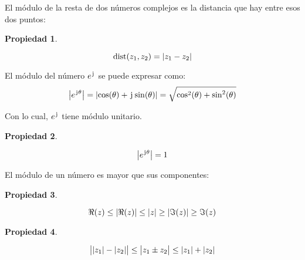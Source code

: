 \documentclass[a5paper,12pt,twoside]{book}
\newtheorem{prop}{{Propiedad}}[chapter]
\begin{document}
El módulo de la resta de dos números complejos es la distancia que hay entre esos dos puntos:

\begin{mdframed}[style=PropertyFrame]
    \begin{prop}
        \label{prop:distance}
    \end{prop}
    \begin{equation*}
        \operatorname{dist}(z_1,z_2)={\left| {z_1-z_2} \right|}
    \end{equation*}
\end{mdframed}

El módulo del número $e^{\mkern2mu\mathrm{j}\mkern1mu}$ se puede expresar como:
\begin{equation*}
    {\left| {e^{\mkern2mu\mathrm{j}\mkern1mu\theta}} \right|} = {\left| {\cos(\theta) + \mkern2mu\mathrm{j}\mkern1mu \sin(\theta)} \right|} = \sqrt{\cos^2(\theta) + \sin^2(\theta)}
\end{equation*}

Con lo cual, $e^{\mkern2mu\mathrm{j}\mkern1mu}$ tiene módulo unitario.

\begin{mdframed}[style=PropertyFrame]
    \begin{prop}
        \label{prop:eAbsoluteValue}
    \end{prop}
    \begin{equation*}
        {\left| {e^{\mkern2mu\mathrm{j}\mkern1mu\theta}} \right|} = 1
    \end{equation*}
\end{mdframed}

El módulo de un número es mayor que sus componentes:

\begin{mdframed}[style=PropertyFrame]
    \begin{prop}
        \label{prop:zAbsoluteValue}
    \end{prop}
    \begin{equation*}
        \Re(z) \leq {\left| {\Re(z)} \right|} \leq {\left| {z} \right|} \geq {\left| {\Im(z)} \right|} \geq \Im(z)
    \end{equation*}
\end{mdframed}

\begin{mdframed}[style=PropertyFrame]
    \begin{prop}
        \label{prop:triangleInequality}
    \end{prop}
    \begin{equation*}
        \big| {\left| {z_1} \right|}-{\left| {z_2} \right|} \big| \leq \big| z_1 \pm z_2 \big|\leq {\left| {z_1} \right|} + {\left| {z_2} \right|}
    \end{equation*}
\end{mdframed}
\end{document}
